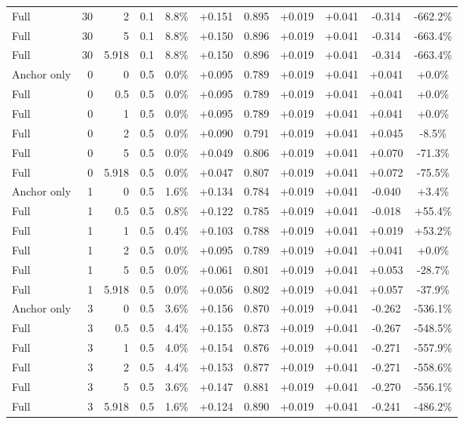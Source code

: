 \begin{table}[htbp]
\begin{tabular}{lrrrccccccc}
Full & 30 & 2 & 0.1 & 8.8\% & +0.151 & 0.895 & +0.019 & +0.041 & -0.314 & -662.2\% \\
Full & 30 & 5 & 0.1 & 8.8\% & +0.150 & 0.896 & +0.019 & +0.041 & -0.314 & -663.4\% \\
Full & 30 & 5.918 & 0.1 & 8.8\% & +0.150 & 0.896 & +0.019 & +0.041 & -0.314 & -663.4\% \\
Anchor only & 0 & 0 & 0.5 & 0.0\% & +0.095 & 0.789 & +0.019 & +0.041 & +0.041 & +0.0\% \\
Full & 0 & 0.5 & 0.5 & 0.0\% & +0.095 & 0.789 & +0.019 & +0.041 & +0.041 & +0.0\% \\
Full & 0 & 1 & 0.5 & 0.0\% & +0.095 & 0.789 & +0.019 & +0.041 & +0.041 & +0.0\% \\
Full & 0 & 2 & 0.5 & 0.0\% & +0.090 & 0.791 & +0.019 & +0.041 & +0.045 & -8.5\% \\
Full & 0 & 5 & 0.5 & 0.0\% & +0.049 & 0.806 & +0.019 & +0.041 & +0.070 & -71.3\% \\
Full & 0 & 5.918 & 0.5 & 0.0\% & +0.047 & 0.807 & +0.019 & +0.041 & +0.072 & -75.5\% \\
Anchor only & 1 & 0 & 0.5 & 1.6\% & +0.134 & 0.784 & +0.019 & +0.041 & -0.040 & +3.4\% \\
Full & 1 & 0.5 & 0.5 & 0.8\% & +0.122 & 0.785 & +0.019 & +0.041 & -0.018 & +55.4\% \\
Full & 1 & 1 & 0.5 & 0.4\% & +0.103 & 0.788 & +0.019 & +0.041 & +0.019 & +53.2\% \\
Full & 1 & 2 & 0.5 & 0.0\% & +0.095 & 0.789 & +0.019 & +0.041 & +0.041 & +0.0\% \\
Full & 1 & 5 & 0.5 & 0.0\% & +0.061 & 0.801 & +0.019 & +0.041 & +0.053 & -28.7\% \\
Full & 1 & 5.918 & 0.5 & 0.0\% & +0.056 & 0.802 & +0.019 & +0.041 & +0.057 & -37.9\% \\
Anchor only & 3 & 0 & 0.5 & 3.6\% & +0.156 & 0.870 & +0.019 & +0.041 & -0.262 & -536.1\% \\
Full & 3 & 0.5 & 0.5 & 4.4\% & +0.155 & 0.873 & +0.019 & +0.041 & -0.267 & -548.5\% \\
Full & 3 & 1 & 0.5 & 4.0\% & +0.154 & 0.876 & +0.019 & +0.041 & -0.271 & -557.9\% \\
Full & 3 & 2 & 0.5 & 4.4\% & +0.153 & 0.877 & +0.019 & +0.041 & -0.271 & -558.6\% \\
Full & 3 & 5 & 0.5 & 3.6\% & +0.147 & 0.881 & +0.019 & +0.041 & -0.270 & -556.1\% \\
Full & 3 & 5.918 & 0.5 & 1.6\% & +0.124 & 0.890 & +0.019 & +0.041 & -0.241 & -486.2\% \\

\end{tabular}
\end{table}
